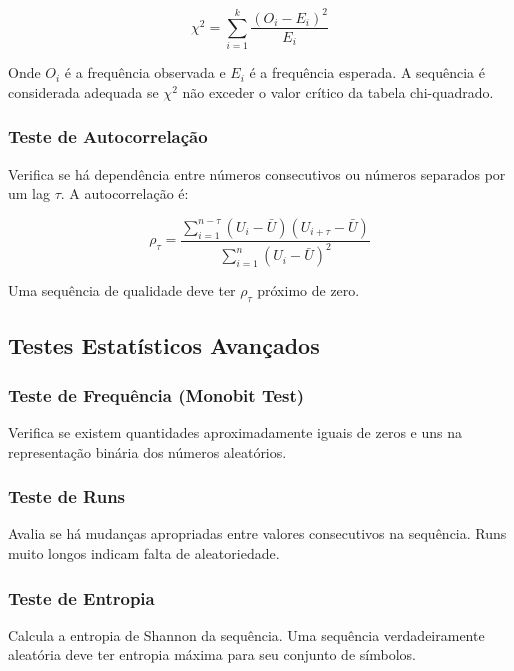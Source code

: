\documentclass[12pt,a4paper]{article}
\begin{document}
\begin{equation}
\chi^2 = \sum_{i=1}^{k} \frac{(O_i - E_i)^2}{E_i}
\end{equation}

Onde $O_i$ é a frequência observada e $E_i$ é a frequência esperada. A sequência é considerada adequada se $\chi^2$ não exceder o valor crítico da tabela chi-quadrado.

\subsubsection{Teste de Autocorrelação}

Verifica se há dependência entre números consecutivos ou números separados por um lag $\tau$. A autocorrelação é:

\begin{equation}
\rho_\tau = \frac{\sum_{i=1}^{n-\tau}(U_i - \bar{U})(U_{i+\tau} - \bar{U})}{\sum_{i=1}^{n}(U_i - \bar{U})^2}
\end{equation}

Uma sequência de qualidade deve ter $\rho_\tau$ próximo de zero.

\subsection{Testes Estatísticos Avançados}

\subsubsection{Teste de Frequência (Monobit Test)}

Verifica se existem quantidades aproximadamente iguais de zeros e uns na representação binária dos números aleatórios.

\subsubsection{Teste de Runs}

Avalia se há mudanças apropriadas entre valores consecutivos na sequência. Runs muito longos indicam falta de aleatoriedade.

\subsubsection{Teste de Entropia}

Calcula a entropia de Shannon da sequência. Uma sequência verdadeiramente aleatória deve ter entropia máxima para seu conjunto de símbolos.
\end{document}
